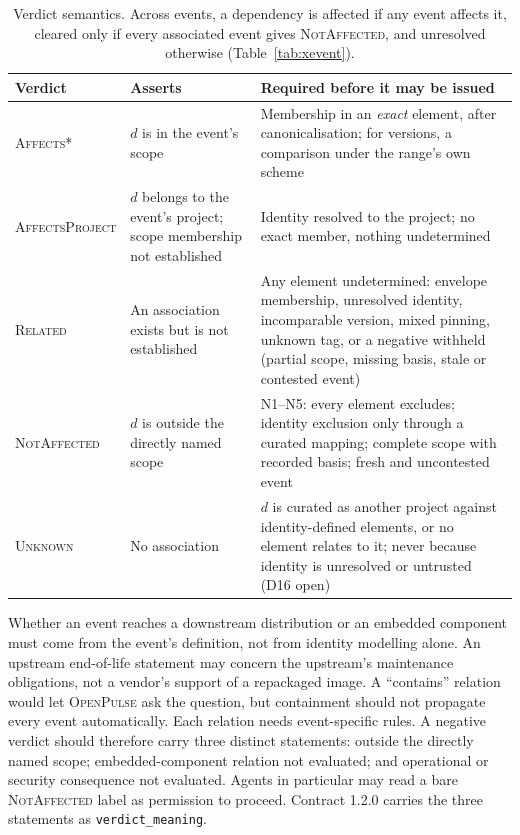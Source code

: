 \documentclass[11pt,a4paper]{article}
\newcommand{\op}{\textsc{OpenPulse}}
\newcommand{\code}[1]{\texttt{#1}}
\begin{document}
\begin{table}[t]
\centering
\footnotesize
\begin{tabularx}{\linewidth}{@{}>{\raggedright\arraybackslash}p{2.5cm} >{\raggedright\arraybackslash}X >{\raggedright\arraybackslash}X@{}}
\toprule
Verdict & Asserts & Required before it may be issued \\
\midrule
\textsc{Affects*} & $d$ is in the event's scope & Membership in an
  \emph{exact} element, after canonicalisation; for versions, a
  comparison under the range's own scheme \\
\textsc{Affects\-Project} & $d$ belongs to the event's project; scope
  membership not established & Identity resolved to the project; no
  exact member, nothing undetermined \\
\textsc{Related} & An association exists but is not established &
  Any element undetermined: envelope membership, unresolved identity,
  incomparable version, mixed pinning, unknown tag, or a negative
  withheld (partial scope, missing basis, stale or contested event) \\
\textsc{Not\-Affected} & $d$ is outside the directly named scope &
  N1--N5: every element excludes; identity exclusion only through a
  curated mapping; complete scope with recorded basis; fresh and
  uncontested event \\
\textsc{Unknown} & No association & $d$ is curated as another project
  against identity-defined elements, or no element relates to it;
  never because identity is unresolved or untrusted (D16 open) \\
\bottomrule
\end{tabularx}
\caption{Verdict semantics. Across events, a dependency is affected if
any event affects it, cleared only if every associated event gives
\textsc{NotAffected}, and unresolved otherwise (Table~\ref{tab:xevent}).}
\label{tab:verdicts}
\end{table}

Whether an event reaches a downstream distribution or an embedded
component must come from the event's definition, not from identity
modelling alone. An upstream end-of-life statement may concern the
upstream's maintenance obligations, not a vendor's support of a
repackaged image. A ``contains'' relation would let \op{} ask the
question, but containment should not propagate every event
automatically. Each relation needs event-specific rules. A negative
verdict should therefore carry three distinct statements: outside the
directly named scope; embedded-component relation not evaluated; and
operational or security consequence not evaluated. Agents in
particular may read a bare \textsc{NotAffected} label as permission to
proceed. Contract 1.2.0 carries the three statements as
\code{verdict\_meaning}.
\end{document}
